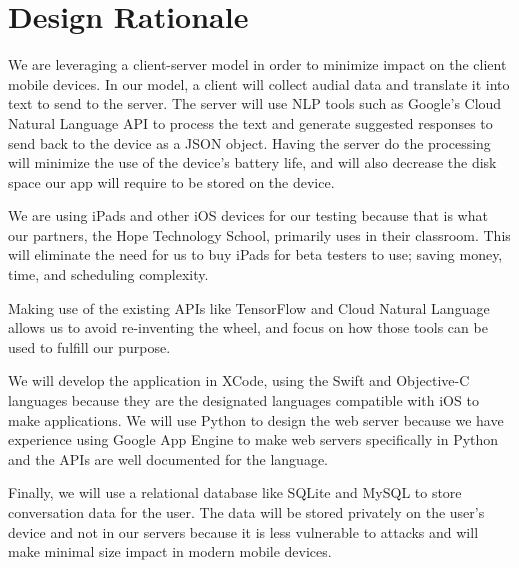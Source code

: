 \chapter{Design Rationale}

We are leveraging a client-server model in order to minimize impact on the client mobile devices. In our model, a client will collect audial data and translate it into text to send to the server. The server will use NLP tools such as Google's Cloud Natural Language API to process the text and generate suggested responses to send back to the device as a JSON object. Having the server do the processing will minimize the use of the device's battery life, and will also decrease the disk space our app will require to be stored on the device. 

We are using iPads and other iOS devices for our testing because that is what our partners, the Hope Technology School, primarily uses in their classroom. This will eliminate the need for us to buy iPads for beta testers to use; saving money, time, and scheduling complexity.

Making use of the existing APIs like TensorFlow and Cloud Natural Language allows us to avoid re-inventing the wheel, and focus on how those tools can be used to fulfill our purpose. 

We will develop the application in XCode, using the Swift and Objective-C languages because they are the designated languages compatible with iOS to make applications. We will use Python to design the web server because we have experience using Google App Engine to make web servers specifically in Python and the APIs are well documented for the language.

Finally, we will use a relational database like SQLite and MySQL to store conversation data for the user. The data will be stored privately on the user's device and not in our servers because it is less vulnerable to attacks and will make minimal size impact in modern mobile devices.
